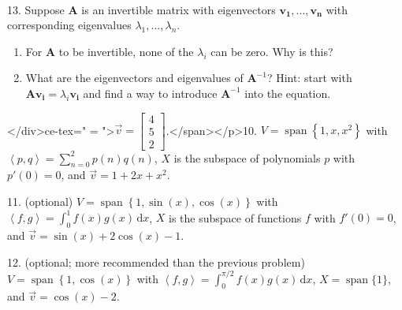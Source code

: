 \documentclass{article}
\begin{document}
~\\

13. Suppose $\mathbf{A}$ is an invertible matrix with eigenvectors $\mathbf{v_1}, ..., \mathbf{v_n}$ with corresponding eigenvalues $\lambda_1, ..., \lambda_n$.

\begin{enumerate}

	\item For $\mathbf{A}$ to be invertible, none of the $\lambda_i$ can be zero. Why is this?

	\item What are the eigenvectors and eigenvalues of $\mathbf{A}^{-1}$? Hint: start with $\mathbf{Av_i} = \lambda_i \mathbf{v_i}$ and find a way to introduce $\mathbf{A}^{-1}$ into the equation.

\end{enumerate}

</div>ce-tex=" = \left[\begin{array}{c} 4 \\ 5 \\ 2 \end{array}\right]">$\vec{v} = \left[\begin{array}{c} 4 \\ 5 \\ 2 \end{array}\right]$.</span></p>10. $V = \operatorname{span}\left\{ 1, x, x^2 \right\}$ with $\left< p, q \right> = \sum_{n = 0}^2 p(n)q(n)$, $X$ is the subspace of polynomials $p$ with $p'(0) = 0$, and $\vec{v} = 1 + 2x + x^2$.

11. (optional) $V = \operatorname{span}\left\{ 1, \sin(x), \cos(x) \right\}$ with $\left< f, g \right> = \int_0^1 f(x)g(x)\,\text{d} x$, $X$ is the subspace of functions $f$ with $f'(0) = 0$, and $\vec{v} = \sin(x) + 2\cos(x) - 1$.

12. (optional; more recommended than the previous problem) $V = \operatorname{span}\left\{ 1, \cos(x) \right\}$ with $\left< f, g \right> = \int_0^{\pi/2} f(x)g(x)\,\text{d} x$, $X = \operatorname{span}\{1\}$, and $\vec{v} = \cos(x) - 2$.
\end{document}
